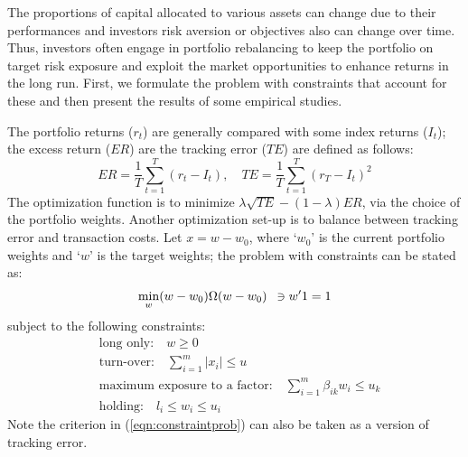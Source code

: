 The proportions of capital allocated to various assets can change due to their performances and investors risk aversion or objectives also can change over time. Thus, investors often engage in portfolio rebalancing to keep the portfolio on target risk exposure and exploit the market opportunities to enhance returns in the long run. First, we formulate the problem with constraints that account for these and then present the results of some empirical studies.


The portfolio returns ($r_t$) are generally compared with some index returns ($I_t$); the excess return ($ER$) are the tracking error ($TE$) are defined as follows:
	\begin{equation} \label{eqn:excesstrack}
	ER= \dfrac{1}{T} \sum_{t=1}^T (r_t - I_t), \quad TE= \dfrac{1}{T} \sum_{t=1}^T (r_T - I_t)^2
	\end{equation}
The optimization function is to minimize $\lambda\sqrt{TE} - (1-\lambda)ER$, via the choice of the portfolio weights. Another optimization set-up is to balance between tracking error and transaction costs. Let $x=w-w_0$, where `$w_0$' is the current portfolio weights and `$w$' is the target weights; the problem with constraints can be stated as:
	\begin{equation}\label{eqn:constraintprob}
	\min_w (w-w_0) \Omega (w-w_0) \enskip \ni w'1=1
	\end{equation}
subject to the following constraints:
	\begin{equation}\label{eqn:constraintlist}
	\begin{split}
	&\text{long only:} \quad w \geq 0 \\
	&\text{turn-over:} \quad \sum_{i=1}^m |x_i| \leq u \\
	&\text{maximum exposure to a factor:} \quad \sum_{i=1}^m \beta_{ik} w_i \leq u_k \\
	&\text{holding:} \quad l_i \leq w_i \leq u_i
	\end{split}
	\end{equation}
Note the criterion in (\ref{eqn:constraintprob}) can also be taken as a version of tracking error. 


